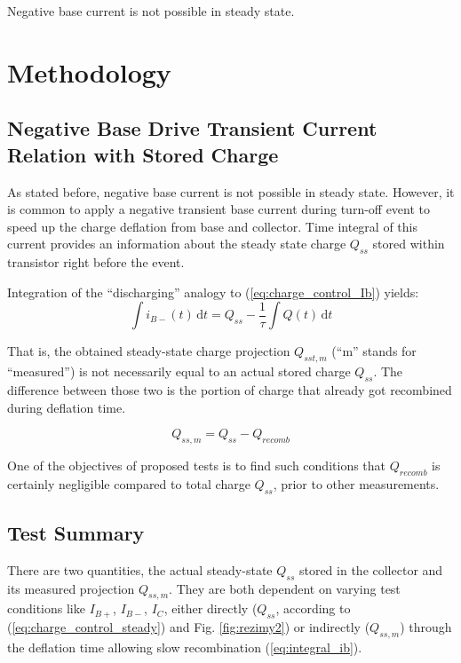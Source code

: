 \documentclass[conference]{IEEEtran}
\newcommand{\dif}{\, \mathrm{d}}	%
\begin{document}
Negative base current is not possible in steady state.


\section{Methodology}
\subsection{Negative Base Drive Transient Current Relation with Stored Charge}
As stated before, negative base current is not possible in steady state. However, it is common to apply a negative transient base current during turn-off event to speed up the charge deflation from base and collector. Time integral of this current provides an information about the steady state charge $Q_{ss}$ stored within transistor right before the event.

Integration of the ``discharging'' analogy to (\ref{eq:charge_control_Ib}) yields:
\begin{equation}
    \int i_{B-}(t) \dif t = Q_{ss} - \frac{1}{\tau} \int Q(t)\dif t
    \label{eq:integral_ib}
\end{equation}

That is, the obtained steady-state charge projection $Q_{sst,m}$ (``m'' stands for ``measured'') is not necessarily equal to an actual stored charge $Q_{ss}$. The difference between those two is the portion of charge that already got recombined during deflation time.

\begin{equation}
    Q_{ss,m} = Q_{ss} - Q_{recomb}
    \label{eq:Qssm_Qss}
\end{equation}

One of the objectives of proposed tests is to find such conditions that $Q_{recomb}$ is certainly negligible compared to total charge $Q_{ss}$, prior to other measurements.

\subsection{Test Summary} \label{sec:summary}
There are two quantities, the actual steady-state $Q_{ss}$ stored in the collector and its measured projection $Q_{ss,m}$. They are both dependent on varying test conditions like $I_{B+}$, $I_{B-}$, $I_C$, either directly ($Q_{ss}$, according to (\ref{eq:charge_control_steady}) and Fig. \ref{fig:rezimy2}) or indirectly ($Q_{ss,m}$) through the deflation time allowing slow recombination (\ref{eq:integral_ib}).
\end{document}

